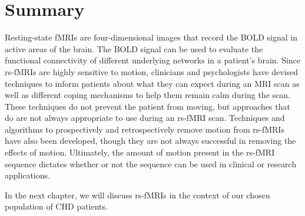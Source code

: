 \section{Summary}

Resting-state fMRIs are four-dimensional images that record the BOLD signal in active areas of the brain. The BOLD signal can be used to evaluate the functional connectivity of different underlying networks in a patient's brain. Since rs-fMRIs are highly sensitive to motion, clinicians and psychologists have devised techniques to inform patients about what they can expect during an MRI scan as well as different coping mechanisms to help them remain calm during the scan. These techniques do not prevent the patient from moving, but approaches that do are not always appropriate to use during an rs-fMRI scan. Techniques and algorithms to prospectively and retrospectively remove motion from rs-fMRIs have also been developed, though they are not always successful in removing the effects of motion. Ultimately, the amount of motion present in the rs-fMRI sequence dictates whether or not the sequence can be used in clinical or research applications.

In the next chapter, we will discuss rs-fMRIs in the context of our chosen population of CHD patients.